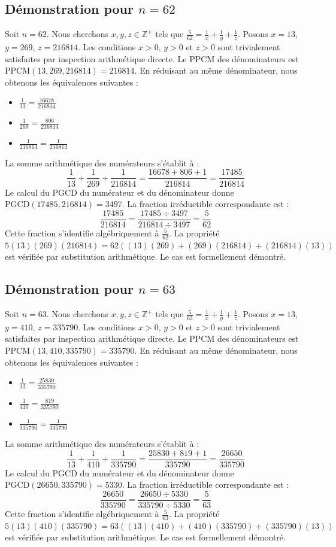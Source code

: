 \documentclass[12pt,a4paper]{article}
\begin{document}
\subsection{Démonstration pour $n = 62$}
Soit $n = 62$. Nous cherchons $x, y, z \in \mathbb{Z}^{+}$ tels que $\frac{5}{62} = \frac{1}{x} + \frac{1}{y} + \frac{1}{z}$.
Posons $x = 13$, $y = 269$, $z = 216814$.
Les conditions $x > 0$, $y > 0$ et $z > 0$ sont trivialement satisfaites par inspection arithmétique directe.
Le PPCM des dénominateurs est $\text{PPCM}(13, 269, 216814) = 216814$.
En réduisant au même dénominateur, nous obtenons les équivalences suivantes :
\begin{itemize}
    \item $\frac{1}{13} = \frac{16678}{216814}$
    \item $\frac{1}{269} = \frac{806}{216814}$
    \item $\frac{1}{216814} = \frac{1}{216814}$
\end{itemize}
La somme arithmétique des numérateurs s'établit à :
$$ \frac{1}{13} + \frac{1}{269} + \frac{1}{216814} = \frac{16678 + 806 + 1}{216814} = \frac{17485}{216814} $$
Le calcul du PGCD du numérateur et du dénominateur donne $\text{PGCD}(17485, 216814) = 3497$.
La fraction irréductible correspondante est :
$$ \frac{17485}{216814} = \frac{17485 \div 3497}{216814 \div 3497} = \frac{5}{62} $$
Cette fraction s'identifie algébriquement à $\frac{5}{62}$.
La propriété $5(13)(269)(216814) = 62((13)(269) + (269)(216814) + (216814)(13))$ est vérifiée par substitution arithmétique.
Le cas est formellement démontré.

\subsection{Démonstration pour $n = 63$}
Soit $n = 63$. Nous cherchons $x, y, z \in \mathbb{Z}^{+}$ tels que $\frac{5}{63} = \frac{1}{x} + \frac{1}{y} + \frac{1}{z}$.
Posons $x = 13$, $y = 410$, $z = 335790$.
Les conditions $x > 0$, $y > 0$ et $z > 0$ sont trivialement satisfaites par inspection arithmétique directe.
Le PPCM des dénominateurs est $\text{PPCM}(13, 410, 335790) = 335790$.
En réduisant au même dénominateur, nous obtenons les équivalences suivantes :
\begin{itemize}
    \item $\frac{1}{13} = \frac{25830}{335790}$
    \item $\frac{1}{410} = \frac{819}{335790}$
    \item $\frac{1}{335790} = \frac{1}{335790}$
\end{itemize}
La somme arithmétique des numérateurs s'établit à :
$$ \frac{1}{13} + \frac{1}{410} + \frac{1}{335790} = \frac{25830 + 819 + 1}{335790} = \frac{26650}{335790} $$
Le calcul du PGCD du numérateur et du dénominateur donne $\text{PGCD}(26650, 335790) = 5330$.
La fraction irréductible correspondante est :
$$ \frac{26650}{335790} = \frac{26650 \div 5330}{335790 \div 5330} = \frac{5}{63} $$
Cette fraction s'identifie algébriquement à $\frac{5}{63}$.
La propriété $5(13)(410)(335790) = 63((13)(410) + (410)(335790) + (335790)(13))$ est vérifiée par substitution arithmétique.
Le cas est formellement démontré.
\end{document}
